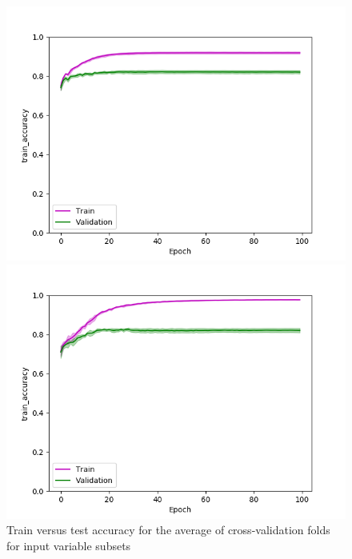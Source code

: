 \def\year{2017}\relax \documentclass[letterpaper]{article}
\begin{document}
\begin{figure}
\begin{minipage}{.24\textwidth}
  \centering
\includegraphics[width=\textwidth]{pics/d3_train_accuracy_mean_train_test.png}
\caption{$D_3$}\label{fig:d3acctraintest}
\end{minipage}
\begin{minipage}{.01\textwidth}
\end{minipage}
\begin{minipage}{.24\textwidth}
  \centering
\includegraphics[width=\textwidth]{pics/d4_train_accuracy_mean_train_test.png}
\caption{$D_4$}\label{fig:d4acctraintest}
\end{minipage}
\caption{Train versus test accuracy for the average of cross-validation folds for input variable subsets}\label{fig:traintestacc}
\end{figure}
\end{document}
